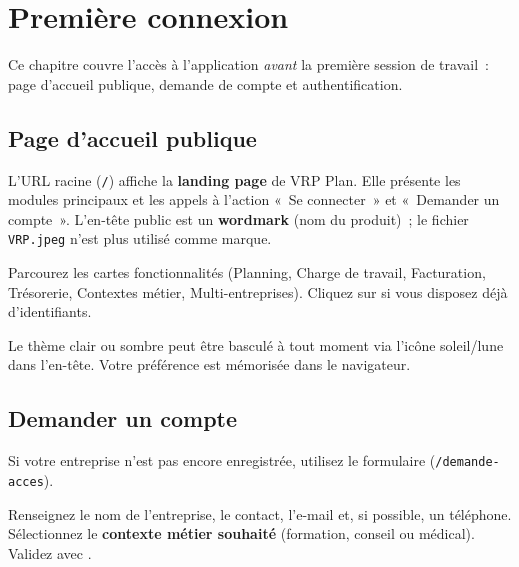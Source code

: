 \chapter{Première connexion}
\label{ch:connexion}

Ce chapitre couvre l'accès à l'application \emph{avant} la première session de travail~: page d'accueil publique, demande de compte et authentification.

\section{Page d'accueil publique}

L'URL racine (\texttt{/}) affiche la \textbf{landing page} de VRP Plan. Elle présente les modules principaux et les appels à l'action «~Se connecter~» et «~Demander un compte~». L'en-tête public est un \textbf{wordmark} (nom du produit)~; le fichier \texttt{VRP.jpeg} n'est plus utilisé comme marque.


\begin{workflowstep}
  Parcourez les cartes fonctionnalités (Planning, Charge de travail, Facturation, Trésorerie, Contextes métier, Multi-entreprises). Cliquez sur  si vous disposez déjà d'identifiants.
\end{workflowstep}

Le thème clair ou sombre peut être basculé à tout moment via l'icône soleil/lune dans l'en-tête. Votre préférence est mémorisée dans le navigateur.

\section{Demander un compte}

Si votre entreprise n'est pas encore enregistrée, utilisez le formulaire  (\texttt{/demande-acces}).


\begin{workflowstep}
  Renseignez le nom de l'entreprise, le contact, l'e-mail et, si possible, un téléphone. Sélectionnez le \textbf{contexte métier souhaité} (formation, conseil ou médical). Validez avec .
\end{workflowstep}

